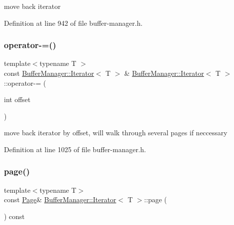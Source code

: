 move back iterator 

Definition at line 942 of file buffer-\/manager.\+h.

\mbox{\label{class_buffer_manager_1_1_iterator_a2a24e019d3a2934f3cd275b8a2436e59}} 
\subsubsection{\texorpdfstring{operator-\/=()}{operator-=()}}
{\footnotesize\ttfamily template$<$typename T $>$ \\
const \mbox{\hyperlink{class_buffer_manager_1_1_iterator}{Buffer\+Manager\+::\+Iterator}}$<$ T $>$ \& \mbox{\hyperlink{class_buffer_manager_1_1_iterator}{Buffer\+Manager\+::\+Iterator}}$<$ T $>$\+::operator-\/= (\begin{DoxyParamCaption}\item[{int}]{offset }\end{DoxyParamCaption})\hspace{0.3cm}{\ttfamily [inline]}}

move back iterator by offset, will walk through several pages if neccessary 

Definition at line 1025 of file buffer-\/manager.\+h.

\mbox{\label{class_buffer_manager_1_1_iterator_a5a17d8377bc10f437e29b058c0376b15}} 
\subsubsection{\texorpdfstring{page()}{page()}}
{\footnotesize\ttfamily template$<$typename T$>$ \\
const \mbox{\hyperlink{struct_page}{Page}}\& \mbox{\hyperlink{class_buffer_manager_1_1_iterator}{Buffer\+Manager\+::\+Iterator}}$<$ T $>$\+::page (\begin{DoxyParamCaption}{ }\end{DoxyParamCaption}) const\hspace{0.3cm}{\ttfamily [inline]}}

